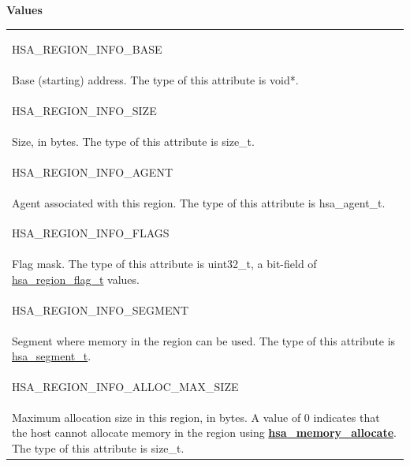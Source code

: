 \documentclass[final]{book}
\newcommand{\reffun}[1]{\textbf{#1}}
\newcommand{\reftyp}[1]{#1}
\newcommand{\refenu}[1]{\reftyp{#1}}
\begin{document}
\noindent\textbf{Values}\\[-5mm]
\begin{longtable}{@{\hspace{2em}}p{\linewidth-2em}}
\hspace{-2em}\hypertarget{group__memory_1ggad35755078ff15f645c6c25e7f7ef2707af5033c8ce5609f9055ae0624e04d1c83}{\refenu{HSA_\-REGION_\-INFO_\-BASE}} \\Base (starting) address. The type of this attribute is void*.\\[2mm]
\hspace{-2em}\hypertarget{group__memory_1ggad35755078ff15f645c6c25e7f7ef2707a09403f5c83497726504523694b3e86b6}{\refenu{HSA_\-REGION_\-INFO_\-SIZE}} \\Size, in bytes. The type of this attribute is size_\-t.\\[2mm]
\hspace{-2em}\hypertarget{group__memory_1ggad35755078ff15f645c6c25e7f7ef2707a92bbdc9ec69d5ed54ea37b4b5c3be58e}{\refenu{HSA_\-REGION_\-INFO_\-AGENT}} \\Agent associated with this region. The type of this attribute is hsa_\-agent_\-t.\\[2mm]
\hspace{-2em}\hypertarget{group__memory_1ggad35755078ff15f645c6c25e7f7ef2707a97869505d019b0800355cab4a21c3403}{\refenu{HSA_\-REGION_\-INFO_\-FLAGS}} \\Flag mask. The type of this attribute is uint32_\-t, a bit-field of \hyperlink{group__memory_1gafaf486b604f88ca026eecdb8ecce528f}{hsa_\-region_\-flag_\-t} values.\\[2mm]
\hspace{-2em}\hypertarget{group__memory_1ggad35755078ff15f645c6c25e7f7ef2707ab2701b5deebcf46596e8f070f6ef27b6}{\refenu{HSA_\-REGION_\-INFO_\-SEGMENT}} \\Segment where memory in the region can be used. The type of this attribute is \hyperlink{group__memory_1ga9aa2ffad72549139936d37692a4214dd}{hsa_\-segment_\-t}.\\[2mm]
\hspace{-2em}\hypertarget{group__memory_1ggad35755078ff15f645c6c25e7f7ef2707ab846101a22f46f61e0caf1d73cedd414}{\refenu{HSA_\-REGION_\-INFO_\-ALLOC_\-MAX_\-SIZE}} \\Maximum allocation size in this region, in bytes. A value of 0 indicates that the host cannot allocate memory in the region using \hyperlink{group__memory_1ga39f7943b93aa2bb754726fc74d929426}{\reffun{hsa_\-memory_\-allocate}}. The type of this attribute is size_\-t.\\[2mm]

\end{longtable}
\end{document}
